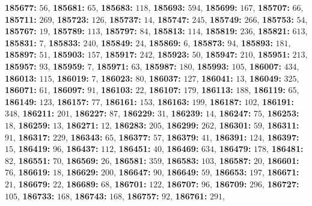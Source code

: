 \textsf{\bfseries 185677:} $56$, \textsf{\bfseries 185681:} $65$, \textsf{\bfseries 185683:} $118$, \textsf{\bfseries 185693:} $594$, \textsf{\bfseries 185699:} $167$, \textsf{\bfseries 185707:} $66$, \textsf{\bfseries 185711:} $269$, \textsf{\bfseries 185723:} $126$, \textsf{\bfseries 185737:} $14$, \textsf{\bfseries 185747:} $245$, \textsf{\bfseries 185749:} $266$, \textsf{\bfseries 185753:} $54$, \textsf{\bfseries 185767:} $19$, \textsf{\bfseries 185789:} $113$, \textsf{\bfseries 185797:} $84$, \textsf{\bfseries 185813:} $114$, \textsf{\bfseries 185819:} $236$, \textsf{\bfseries 185821:} $613$, \textsf{\bfseries 185831:} $7$, \textsf{\bfseries 185833:} $240$, \textsf{\bfseries 185849:} $24$, \textsf{\bfseries 185869:} $6$, \textsf{\bfseries 185873:} $94$, \textsf{\bfseries 185893:} $181$, \textsf{\bfseries 185897:} $51$, \textsf{\bfseries 185903:} $157$, \textsf{\bfseries 185917:} $242$, \textsf{\bfseries 185923:} $50$, \textsf{\bfseries 185947:} $210$, \textsf{\bfseries 185951:} $213$, \textsf{\bfseries 185957:} $93$, \textsf{\bfseries 185959:} $7$, \textsf{\bfseries 185971:} $63$, \textsf{\bfseries 185987:} $180$, \textsf{\bfseries 185993:} $105$, \textsf{\bfseries 186007:} $434$, \textsf{\bfseries 186013:} $115$, \textsf{\bfseries 186019:} $7$, \textsf{\bfseries 186023:} $80$, \textsf{\bfseries 186037:} $127$, \textsf{\bfseries 186041:} $13$, \textsf{\bfseries 186049:} $325$, \textsf{\bfseries 186071:} $61$, \textsf{\bfseries 186097:} $91$, \textsf{\bfseries 186103:} $22$, \textsf{\bfseries 186107:} $179$, \textsf{\bfseries 186113:} $188$, \textsf{\bfseries 186119:} $65$, \textsf{\bfseries 186149:} $123$, \textsf{\bfseries 186157:} $77$, \textsf{\bfseries 186161:} $153$, \textsf{\bfseries 186163:} $199$, \textsf{\bfseries 186187:} $102$, \textsf{\bfseries 186191:} $348$, \textsf{\bfseries 186211:} $201$, \textsf{\bfseries 186227:} $87$, \textsf{\bfseries 186229:} $31$, \textsf{\bfseries 186239:} $14$, \textsf{\bfseries 186247:} $75$, \textsf{\bfseries 186253:} $18$, \textsf{\bfseries 186259:} $13$, \textsf{\bfseries 186271:} $12$, \textsf{\bfseries 186283:} $205$, \textsf{\bfseries 186299:} $262$, \textsf{\bfseries 186301:} $59$, \textsf{\bfseries 186311:} $91$, \textsf{\bfseries 186317:} $229$, \textsf{\bfseries 186343:} $65$, \textsf{\bfseries 186377:} $57$, \textsf{\bfseries 186379:} $41$, \textsf{\bfseries 186391:} $124$, \textsf{\bfseries 186397:} $15$, \textsf{\bfseries 186419:} $96$, \textsf{\bfseries 186437:} $112$, \textsf{\bfseries 186451:} $40$, \textsf{\bfseries 186469:} $634$, \textsf{\bfseries 186479:} $178$, \textsf{\bfseries 186481:} $82$, \textsf{\bfseries 186551:} $70$, \textsf{\bfseries 186569:} $26$, \textsf{\bfseries 186581:} $359$, \textsf{\bfseries 186583:} $103$, \textsf{\bfseries 186587:} $20$, \textsf{\bfseries 186601:} $76$, \textsf{\bfseries 186619:} $18$, \textsf{\bfseries 186629:} $200$, \textsf{\bfseries 186647:} $90$, \textsf{\bfseries 186649:} $59$, \textsf{\bfseries 186653:} $197$, \textsf{\bfseries 186671:} $21$, \textsf{\bfseries 186679:} $22$, \textsf{\bfseries 186689:} $68$, \textsf{\bfseries 186701:} $122$, \textsf{\bfseries 186707:} $96$, \textsf{\bfseries 186709:} $296$, \textsf{\bfseries 186727:} $105$, \textsf{\bfseries 186733:} $168$, \textsf{\bfseries 186743:} $168$, \textsf{\bfseries 186757:} $92$, \textsf{\bfseries 186761:} $291$, 
